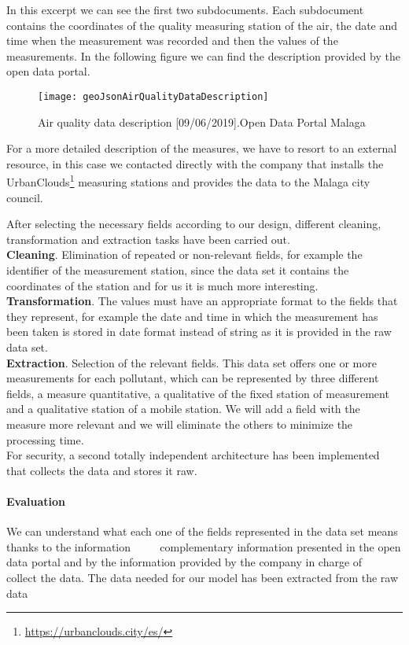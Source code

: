     In this excerpt we can see the first two subdocuments. Each subdocument contains the coordinates of the quality measuring station
    of the air, the date and time when the measurement was recorded and then the values of the measurements.
    In the following figure we can find the description provided by the open data portal.
\begin{figure}[ht]
    \centering
    \texttt{[image: geoJsonAirQualityDataDescription]}
    \caption{Air quality data description [09/06/2019].Open Data Portal Malaga}
\end{figure}


For a more detailed description of the measures, we have to resort to an external resource, in this case we contacted directly with
the company that installs the UrbanClouds\footnote{\url{https://urbanclouds.city/es/}} measuring stations and provides the data to the Malaga city council.

After selecting the necessary fields according to our design, different cleaning, transformation and extraction tasks have been carried out. \\


\textbf{Cleaning}. Elimination of repeated or non-relevant fields, for example the identifier of the measurement station, since the data set
it contains the coordinates of the station and for us it is much more interesting. \\

\textbf{Transformation}. The values must have an appropriate format to the fields that they represent, for example the date and time in which the measurement has been taken is stored in date format
instead of string as it is provided in the raw data set. \\

\textbf{Extraction}. Selection of the relevant fields. This data set offers one or more measurements for each pollutant, which can be represented by three different fields, a measure
quantitative, a qualitative of the fixed station of measurement and a qualitative station of a mobile station. We will add a field with the measure
more relevant and we will eliminate the others to minimize the processing time. \\

For security, a second totally independent architecture has been implemented that collects the data and stores it raw.

\paragraph{Evaluation} \mbox{} 
\begin{itemize}
    \done We can understand what each one of the fields represented in the data set means thanks to the information
         complementary information presented in the open data portal and by the information provided by the company in charge of
         collect the data.
    \done The data needed for our model has been extracted from the raw data
    
\end{itemize}
\newpage
